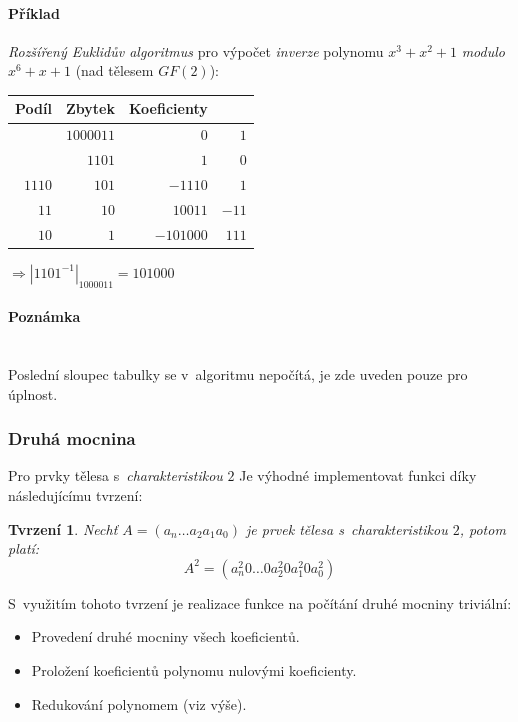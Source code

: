 \documentclass[thesis=M,czech,hidelinks]{FITthesis}[2012/06/26]
\newcommand{\0}{{\textcolor[gray]{0.80}{0}}}
\newtheorem{tvrzeni}{Tvrzení}
\begin{document}
\paragraph{Příklad} \emph{Rozšířený Euklidův algoritmus} pro výpočet
\emph{inverze} polynomu $x^3+x^2+1$ \emph{modulo} $x^6+x+1$ (nad tělesem
$GF(2)$):

\begin{center}
    \begin{tabular}{r|r r r}
          Podíl &    Zbytek &       Koeficienty \\
        \hline
        \hline
                & $1000011$ &       $0$ &   $1$ \\
                &    $1101$ &       $1$ &   $0$ \\
        \hline
         $1110$ &     $101$ &   $-1110$ &   $1$ \\
           $11$ &      $10$ &   $10011$ & $-11$ \\
           $10$ &       $1$ & $-101000$ & $111$
    \end{tabular}
\end{center}

$ \Rightarrow \left|1101^{-1}\right|_{1000011} = 101000 $

\paragraph{Poznámka} \hfil \\
Poslední sloupec tabulky se v~algoritmu nepočítá, je zde uveden pouze pro
úplnost.


\subsubsection{Druhá mocnina}
Pro prvky tělesa s~\emph{charakteristikou} $2$ Je výhodné implementovat funkci
 díky následujícímu tvrzení:


\begin{tvrzeni}
    Nechť $A=(a_n \dots a_2 a_1 a_0)$ je prvek tělesa
    s~\emph{charakteristikou} $2$, potom platí:
    $$ A^2 = (a_n^2 0 \dots 0 a_2^2 0 a_1^2 0 a_0^2) $$
\end{tvrzeni}

S~využitím tohoto tvrzení je realizace funkce na počítání druhé mocniny
triviální:
\begin{itemize}
    \item Provedení druhé mocniny všech koeficientů.
    \item Proložení koeficientů polynomu nulovými koeficienty.
    \item Redukování polynomem (viz výše).
\end{itemize}
\end{document}
